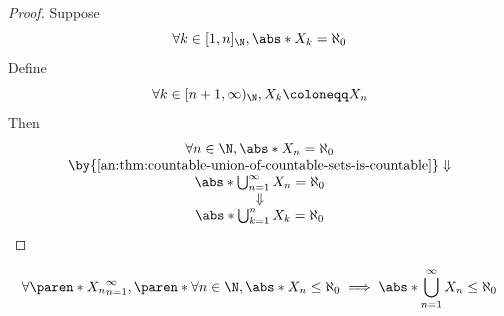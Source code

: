 \begin{proof}
  Suppose
  \[
    \forall k \in [1, n]_{\N}, \abs*{X_{k}} = \aleph_{0}
  \]
  Define
  \[
    \forall k \in [n + 1, \infty)_{\N}, X_{k} \coloneqq X_{n}
  \]
  Then
  \[
    \begin{array}{c}
      \forall n \in \N, \abs*{X_{n}} = \aleph_{0}                                  \\
      \by{\Cref{an:thm:countable-union-of-countable-sets-is-countable}} \Downarrow \\
      \abs*{\bigcup_{n = 1}^{\infty} X_{n}} = \aleph_{0}                           \\
      \Downarrow                                                                   \\
      \abs*{\bigcup_{k = 1}^{n} X_{k}} = \aleph_{0}
    \end{array}
  \]
\end{proof}

\begin{theorem} \label{an:thm:at-most-countable-union-of-at-most-countable-sets-is-at-most-countable}
  \[
    \forall \paren*{X_{n}}_{n = 1}^{\infty},
    \paren*{\forall n \in \N, \abs*{X_{n}} \leq \aleph_{0}}
    \implies \abs*{\bigcup_{n = 1}^{\infty} X_{n}} \leq \aleph_{0}
  \]
\end{theorem}

